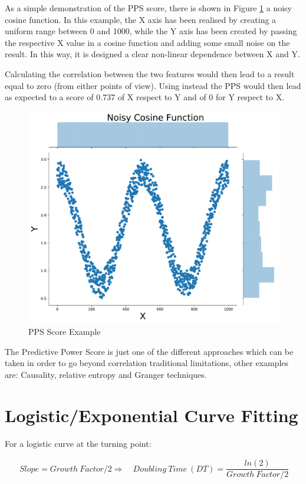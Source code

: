\begin{appendices}
As a simple demonstration of the PPS score, there is shown in Figure \ref{pps_ex} a noisy cosine function. In this example, the X axis has been realised by creating a uniform range between 0 and 1000, while the Y axis has been created by passing the respective X value in a cosine function and adding some small noise on the result. In this way, it is designed a clear non-linear dependence between X and Y. 

Calculating the correlation between the two features would then lead to a result equal to zero (from either points of view). Using instead the PPS would then lead as expected to a score of 0.737 of X respect to Y and of 0 for Y respect to X. 

\begin{figure}[ht!]%
    \centering
    \includegraphics[width=0.45\linewidth]{latex/images/pps_ex.pdf}
    \vspace{-0.2cm}
    \caption{PPS Score Example}
    \label{pps_ex}
\end{figure}

The Predictive Power Score is just one of the different approaches which can be taken in order to go beyond correlation traditional limitations, other examples are: Causality, relative entropy and Granger techniques.

\clearpage

\section{Logistic/Exponential Curve Fitting}
\label{exp_fit}

For a logistic curve at the turning point: 

\useshortskip
\begin{align}
\ Slope = Growth\:Factor/2 \Rightarrow\quad Doubling\:Time\:(DT) = \dfrac{ln(2)}{Growth \:Factor/2}
\end{align}
\useshortskip


\end{appendices}
